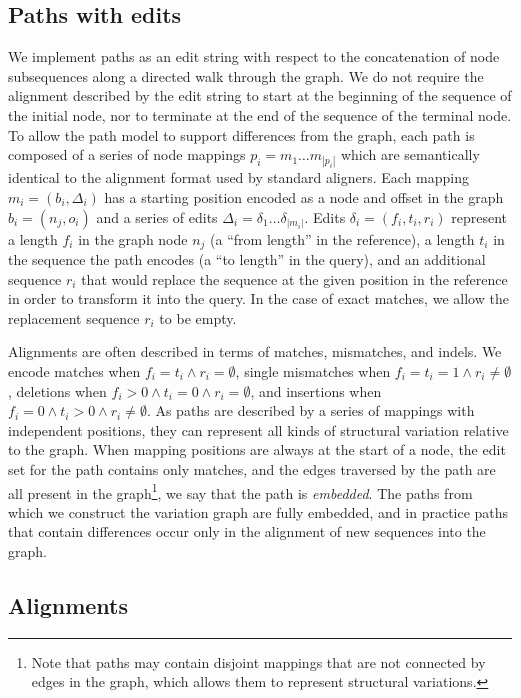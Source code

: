 \subsection{Paths with edits}

We implement paths as an edit string with respect to the concatenation of node subsequences along a directed walk through the graph.
We do not require the alignment described by the edit string to start at the beginning of the sequence of the initial node, nor to terminate at the end of the sequence of the terminal node.
To allow the path model to support differences from the graph, each path is composed of a series of node mappings $p_i = m_1 \ldots m_{|p_i|}$ which are semantically identical to the alignment format used by standard aligners.
Each mapping $m_i = ( b_i, \Delta_i )$ has a starting position encoded as a node and offset in the graph $b_i = ( n_j, o_i )$ and a series of edits $\Delta_i = \delta_1 \ldots \delta_{|m_i|}$.
Edits $\delta_i = ( f_i, t_i, r_i )$ represent a length $f_i$ in the graph node $n_j$ (a ``from length'' in the reference), a length $t_i$ in the sequence the path encodes (a ``to length'' in the query), and an additional sequence $r_i$ that would replace the sequence at the given position in the reference in order to transform it into the query.
In the case of exact matches, we allow the replacement sequence $r_i$ to be empty.

Alignments are often described in terms of matches, mismatches, and indels.
We encode matches when $f_i = t_i \land r_i = \emptyset$, single mismatches when $f_i = t_i = 1 \land r_i \neq \emptyset$, deletions when $f_i > 0 \land t_i = 0 \land r_i = \emptyset$, and insertions when $f_i = 0 \land t_i > 0 \land r_i \neq \emptyset$.
As paths are described by a series of mappings with independent positions, they can represent all kinds of structural variation relative to the graph.
When mapping positions are always at the start of a node, the edit set for the path contains only matches, and the edges traversed by the path are all present in the graph\footnote{Note that paths may contain disjoint mappings that are not connected by edges in the graph, which allows them to represent structural variations.}, we say that the path is \emph{embedded}.
The paths from which we construct the variation graph are fully embedded, and in practice paths that contain differences occur only in the alignment of new sequences into the graph.

\subsection{Alignments}
\label{sec:alignments}

